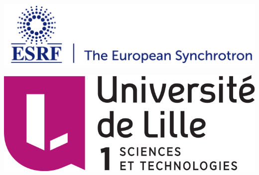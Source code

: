 \documentclass[12pt]{article}
\begin{document}
\parindent=0pt

\begin{minipage}{0.55\linewidth}
    \begin{flushleft}
    \includegraphics[scale=0.28]{ESRF_logo.png}
    \end{flushleft}
\end{minipage}
\hfill
\begin{minipage}{0.40\linewidth}
    \begin{center}
    \includegraphics[scale=0.28]{logo-lille1-2014.png}
    \end{center}
\end{minipage}

\vspace{0.2cm}
\hrulefill
\vspace{0.2cm}
\end{document}
